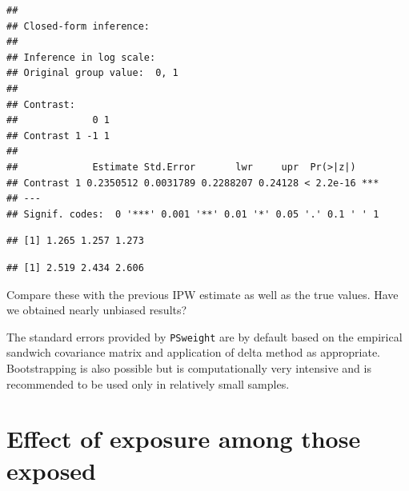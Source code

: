 \documentclass[
]{book}
\newenvironment{Shaded}{\begin{snugshade}}{\end{snugshade}}
\newcommand{\AttributeTok}[1]{\textcolor[rgb]{0.13,0.29,0.53}{#1}}
\newcommand{\DecValTok}[1]{\textcolor[rgb]{0.00,0.00,0.81}{#1}}
\newcommand{\FunctionTok}[1]{\textcolor[rgb]{0.13,0.29,0.53}{\textbf{#1}}}
\newcommand{\NormalTok}[1]{#1}
\newcommand{\SpecialCharTok}[1]{\textcolor[rgb]{0.81,0.36,0.00}{\textbf{#1}}}
\newcommand{\StringTok}[1]{\textcolor[rgb]{0.31,0.60,0.02}{#1}}
\begin{document}
\begin{verbatim}
## 
## Closed-form inference: 
## 
## Inference in log scale: 
## Original group value:  0, 1 
## 
## Contrast: 
##             0 1
## Contrast 1 -1 1
## 
##             Estimate Std.Error       lwr     upr  Pr(>|z|)    
## Contrast 1 0.2350512 0.0031789 0.2288207 0.24128 < 2.2e-16 ***
## ---
## Signif. codes:  0 '***' 0.001 '**' 0.01 '*' 0.05 '.' 0.1 ' ' 1
\end{verbatim}

\begin{Shaded}
\end{Shaded}

\begin{verbatim}
## [1] 1.265 1.257 1.273
\end{verbatim}

\begin{Shaded}
\end{Shaded}

\begin{verbatim}
## [1] 2.519 2.434 2.606
\end{verbatim}

Compare these with the previous IPW estimate as
well as the true values. Have we obtained nearly unbiased results?

The standard errors provided by \texttt{PSweight}
are by default based on the
empirical sandwich covariance matrix and application
of delta method as
appropriate. Bootstrapping is also possible but is
computationally very
intensive and is recommended to be used only in relatively small
samples.

\section{Effect of exposure among those exposed}\label{effect-of-exposure-among-those-exposed}
\end{document}
